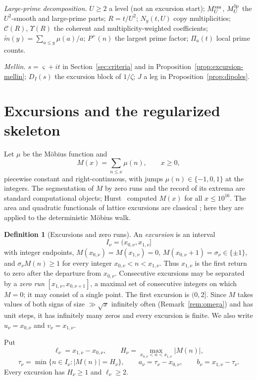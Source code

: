 \documentclass[11pt]{amsart}
\numberwithin{equation}{section}
\theoremstyle{plain}
\theoremstyle{definition}
\newtheorem{definition}[theorem]{Definition}
\theoremstyle{remark}
\newcommand{\Pp}{P^{+}}
\newcommand{\Cc}{\mathcal{C}}
\newcommand{\mt}{\widetilde{m}}
\begin{document}
\smallskip
\noindent\emph{Large-prime decomposition.}
$U\ge2$ a level (not an excursion start); $M^{\rm sm}_U$, $M^{\rm lp}_U$ the
$U^2$-smooth and large-prime parts; $R=t/U^2$; $N_y(t,U)$ copy
multiplicities; $\Cc(R)$, $\Upsilon(R)$ the coherent and multiplicity-weighted
coefficients; $\mt(y)=\sum_{a\le y}\mu(a)/a$; $\Pp(n)$ the largest prime
factor; $\Pi_a(t)$ local prime counts.

\smallskip
\noindent\emph{Mellin.}
$s=\varsigma+it$ in Section~\ref{sec:criteria} and in
Proposition~\ref{prop:excursion-mellin}; $D_I(s)$ the excursion block of
$1/\zeta$; $J$ a leg in Proposition~\ref{prop:dipoles}.

\section{Excursions and the regularized skeleton}
\label{sec:definitions}

Let $\mu$ be the M\"obius function and
\begin{equation}
\label{eq:mertens_def}
M(x)=\sum_{n\le x}\mu(n),\qquad x\ge0,
\end{equation}
piecewise constant and right-continuous, with jumps $\mu(n)\in\{-1,0,1\}$
at the integers. The segmentation of $M$ by zero runs and the record of its
extrema are standard computational objects; Hurst~\cite{Hurst18} computed
$M(x)$ for all $x\le10^{16}$. The area and quadratic functionals of lattice
excursions are classical
\cite{Takacs91,NguyenThe04,Richard05,Janson07,DKW15,CP17}; here they are
applied to the deterministic M\"obius walk.

\begin{definition}[Excursions and zero runs]
\label{def:excursion}
An \emph{excursion} is an interval
\[
I_\nu=(x_{0,\nu},x_{1,\nu}]
\]
with integer endpoints, $M(x_{0,\nu})=M(x_{1,\nu})=0$,
$M(x_{0,\nu}+1)=\sigma_\nu\in\{\pm1\}$, and
$\sigma_\nu M(n)\ge1$ for every integer $x_{0,\nu}<n<x_{1,\nu}$. Thus
$x_{1,\nu}$ is the first return to zero after the departure from
$x_{0,\nu}$. Consecutive excursions may be separated by a \emph{zero run}
$[x_{1,\nu},x_{0,\nu+1}]$, a maximal set of consecutive integers on which
$M=0$; it may consist of a single point. The first excursion is $(0,2]$.
Since $M$ takes values of both signs of size $\gg\sqrt x$ infinitely often
(Remark~\ref{rem:omega}) and has unit steps, it has infinitely many zeros
and every excursion is finite. We also write $u_\nu=x_{0,\nu}$ and
$v_\nu=x_{1,\nu}$.

Put
\[
\ell_\nu=x_{1,\nu}-x_{0,\nu},\qquad
H_\nu=\max_{x_{0,\nu}<n<x_{1,\nu}}|M(n)|,
\]
\[
\tau_\nu=\min\{n\in I_\nu:|M(n)|=H_\nu\},\qquad
a_\nu=\tau_\nu-x_{0,\nu},\qquad b_\nu=x_{1,\nu}-\tau_\nu.
\]
Every excursion has $H_\nu\ge1$ and $\ell_\nu\ge2$.
\end{definition}
\end{document}
